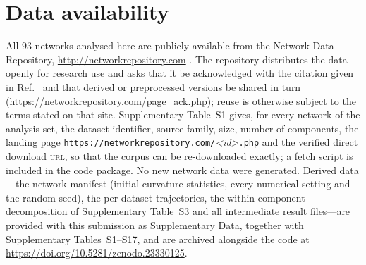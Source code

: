 \documentclass[11pt]{article}
\begin{document}
\section*{Data availability}
All $93$ networks analysed here are publicly available from the {Network Data
Repository}, \url{http://networkrepository.com} \cite{RossiAhmed2015}. The
repository distributes the data openly for research use and asks that it be
acknowledged with the citation given in Ref.~ and that
derived or preprocessed versions be shared in turn
(\url{https://networkrepository.com/page_ack.php}); reuse is otherwise subject
to the terms stated on that site.
Supplementary Table~S1 gives, for every network of the analysis set, the
dataset identifier, source family, size, number of components, the landing page
\texttt{https://networkrepository.com/}\emph{<id>}\texttt{.php} and the
verified direct download \textsc{url}, so that the corpus can be
re-downloaded exactly; a fetch script is included in the code package. No new
network data were generated. Derived data---the network manifest (initial
curvature statistics, every numerical setting and the random seed), the
per-dataset trajectories, the within-component decomposition of Supplementary
Table~S3 and all intermediate result files---are provided with this submission
as Supplementary Data, together with Supplementary Tables~S1--S17, and are
archived alongside the code at \url{https://doi.org/10.5281/zenodo.23330125}.
\end{document}
